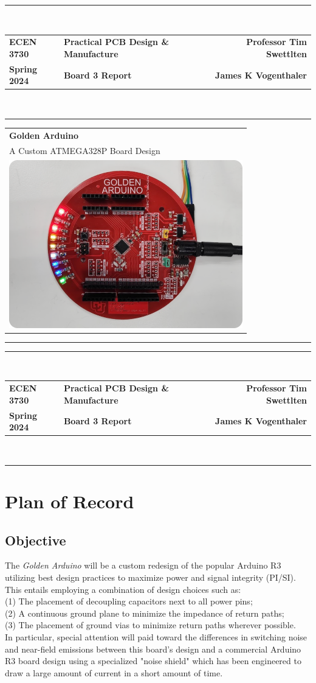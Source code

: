 \documentclass{article}
\newcommand*{\Indent}{\hspace*{1cm}}
\newcommand*{\Header}{
    \rule{\textwidth}{2.5pt}\\
    \begin{tabularx}{\textwidth}{>{\bfseries}l >{\bfseries\centering}X >{\bfseries}r}
    ECEN 3730   & Practical PCB Design \& Manufacture & Professor Tim Swettlten\\
    Spring 2024 & Board 3 Report                      & James K Vogenthaler
    \end{tabularx}\\
    \rule{\textwidth}{1.5pt}

    \vspace*{-5mm}
}
\begin{document}
\setlength\parindent{0pt}
\renewcommand*\contentsname{Table of Contents}

\Header

\vspace*{1cm}
\begin{tabularx}{\textwidth}{>{\centering}X}
\Huge \textbf{Golden Arduino}\\
\large A Custom ATMEGA328P Board Design\\
\vspace*{6mm}
\includegraphics[width=4in]{golden.png}
\vspace*{5mm}
\end{tabularx}

\tableofcontents
\rule{\textwidth}{2.5pt}

\Header

\section{Plan of Record}
\subsection{Objective}
The \textit{Golden Arduino} will be a custom redesign of the popular Arduino R3 utilizing best design practices to maximize power and signal integrity (PI/SI).  This entails employing a combination of design choices such as:
\vspace*{2mm}\\
\Indent (1) The placement of decoupling capacitors next to all power pins;\\
\Indent (2) A continuous ground plane to minimize the impedance of return paths;\\
\Indent (3) The placement of ground vias to minimize return paths wherever possible.
\vspace*{2mm}\\
In particular, special attention will paid toward the differences in switching noise and near-field emissions between this board's design and a commercial Arduino R3 board design using a specialized "noise shield" which has been engineered to draw a large amount of current in a short amount of time.
\end{document}
